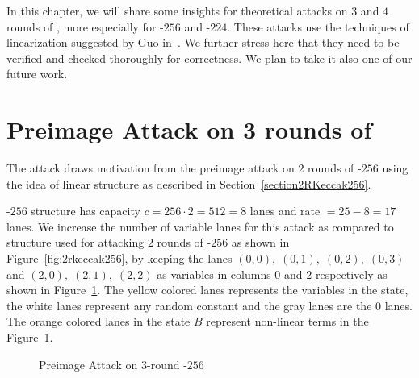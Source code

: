 In this chapter, we will share some insights for theoretical attacks on $3$ and $4$ rounds of \KECCAK{}, more especially for \KECCAK-$256$ and \KECCAK-$224$. These attacks use the techniques of linearization suggested by Guo \etal in~\cite{guo2016linear}. We further stress here that they need to be verified and checked thoroughly for correctness. We plan to take it also one of our future work.

\section{Preimage Attack on 3 rounds of }
\label{3rkeccak256}
The attack draws motivation from the preimage attack on $2$ rounds of \Keccak-$256$ using the idea of linear structure as described in Section~\ref{section2RKeccak256}.

\Keccak-$256$ structure has capacity $c = 256 \cdot 2 = 512 = 8$ lanes and rate $=25-8=17$ lanes. We increase the number of variable lanes for this attack as compared to structure used for attacking $2$ rounds of \Keccak-$256$ as shown in Figure~\ref{fig:2rkeccak256}, by keeping the lanes $(0,0),\;(0,1),\;(0,2),\; (0,3)$ and $(2,0),\; (2,1),\; (2,2)$ as variables in columns $0$ and $2$ respectively as shown in Figure~\ref{fig:3rkeccak256}. The yellow colored lanes represents the variables in the state, the white lanes represent any random constant and the gray lanes are the $0$ lanes. The orange colored lanes in the state $B$ represent non-linear terms in the Figure~\ref{fig:3rkeccak256}.

\begin{figure}[H]
        \centering
        \caption{Preimage Attack on $3$-round \KECCAK-$256$}
        \label{fig:3rkeccak256}
\end{figure}

